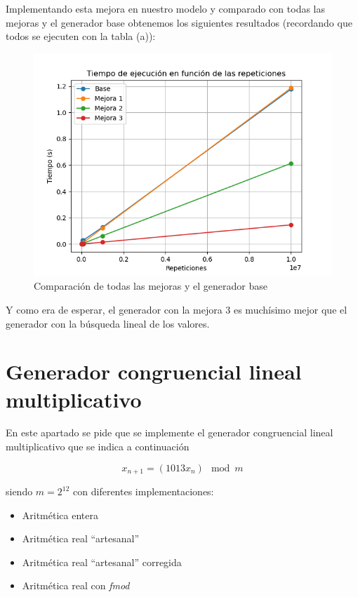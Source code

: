 \documentclass[11pt,a4paper]{report}
\begin{document}
Implementando esta mejora en nuestro modelo y comparado con todas las mejoras y el generador base obtenemos los siguientes resultados (recordando que todos se ejecuten con la tabla (a)):

\begin{figure}[H]
\centering
\includegraphics[width=\linewidth]{img/base-vs-m1-vs-m2-vs-m3.png}
\caption{Comparación de todas las mejoras y el generador base}
\label{mejora3}
\end{figure}

\newpage
Y como era de esperar, el generador con la mejora 3 es muchísimo mejor que el generador con la búsqueda lineal de los valores. 

\section{Generador congruencial lineal multiplicativo}

En este apartado se pide que se implemente el generador congruencial lineal multiplicativo que se indica a continuación

\begin{equation}
 x_{n+1} = (1013x_n) \mod m 
\end{equation}

siendo $m=2^{12}$ con diferentes implementaciones:

\begin{itemize}
	\item{Aritmética entera}
	\item{Aritmética real ``artesanal''}
	\item{Aritmética real ``artesanal'' corregida}
	\item{Aritmética real con \textit{fmod}}
\end{itemize}
\end{document}
